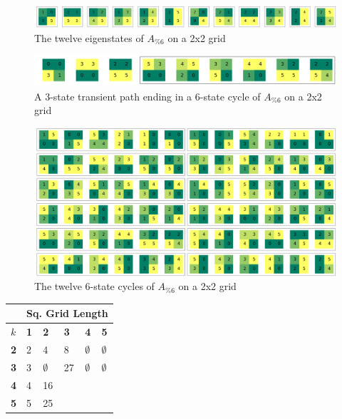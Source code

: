 \documentclass[11pt]{article}
\begin{document}
\begin{figure}
\caption{The twelve eigenstates of $A_{\% 6}$ on a 2x2 grid}
\label{eig622}
\includegraphics[width=\textwidth]{eig622.png}
\end{figure}

\begin{figure}
  \caption{A 3-state transient path ending in a 6-state cycle of $A_{\% 6}$ on a 2x2 grid}
\label{cycle622}
\includegraphics[width=\textwidth]{cycle622.png}
\end{figure}

\begin{figure}
\caption{The twelve 6-state cycles of $A_{\% 6}$ on a 2x2 grid}
\label{cycle622}
\includegraphics[width=\textwidth]{all-len-6-cycles-622.png}
\end{figure}

\begin{tabular}{|l|l|l|l|l|l|}
  \hline
  & \multicolumn{5}{|c|}{Sq. Grid Length} \\ \hline
  $k$ & \textbf{1} & \textbf{2} & \textbf{3} & \textbf{4} & \textbf{5} \\ \hline
  \textbf{2} & 2 & 4 & 8 & $\emptyset$ & $\emptyset$ \\ \hline
  \textbf{3} & 3 & $\emptyset$ & 27 & $\emptyset$ & $\emptyset$ \\ \hline
  \textbf{4} & 4 & 16 & \\ \hline
  \textbf{5} & 5 & 25 \\ \hline
\end{tabular}
\end{document}
